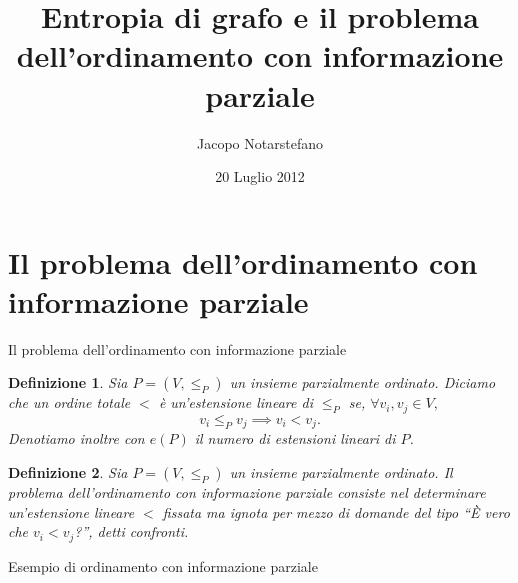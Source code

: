 \documentclass[10pt]{beamer}
\newtheorem{definizione}{Definizione}
\begin{document}
\title[Ordinamento con informazione parziale]{Entropia di grafo e il problema dell'ordinamento con informazione parziale} 
\author{Jacopo Notarstefano} 
\date{20 Luglio 2012}

\begin{frame}[plain]
  \titlepage
\end{frame}

\begin{frame}
  \tableofcontents
\end{frame}

\section{Il problema dell'ordinamento con informazione parziale}
\begin{frame}
  {Il problema dell'ordinamento con informazione parziale}
  \begin{definizione}
    Sia \(P=(V,\le_P)\) un insieme parzialmente ordinato. Diciamo che un 
    ordine totale \(<\) \`e un'\emph{estensione lineare} di \(\le_P\) se, 
    \(\forall v_i, v_j\in V\text{,}\)
    \[v_i\le_P v_j \implies v_i < v_j\text{.}\]
    Denotiamo inoltre con \(e(P)\) il numero di estensioni lineari di \(P\). 
  \end{definizione}
  \vspace{5mm}
  \begin{definizione}
    Sia \(P=(V,\le_P)\) un insieme parzialmente ordinato. Il                     
    \emph{problema dell'ordinamento con informazione parziale} consiste nel 
    determinare un'estensione lineare \(<\) fissata ma ignota per mezzo di 
    domande del tipo ``\`E vero che \(v_i < v_j\)?'', detti \emph{confronti}. 
  \end{definizione}
\end{frame}

\begin{frame}
  {Esempio di ordinamento con informazione parziale}
  \begin{figure}
    \centering
  \end{figure}
\end{frame}
\end{document}
